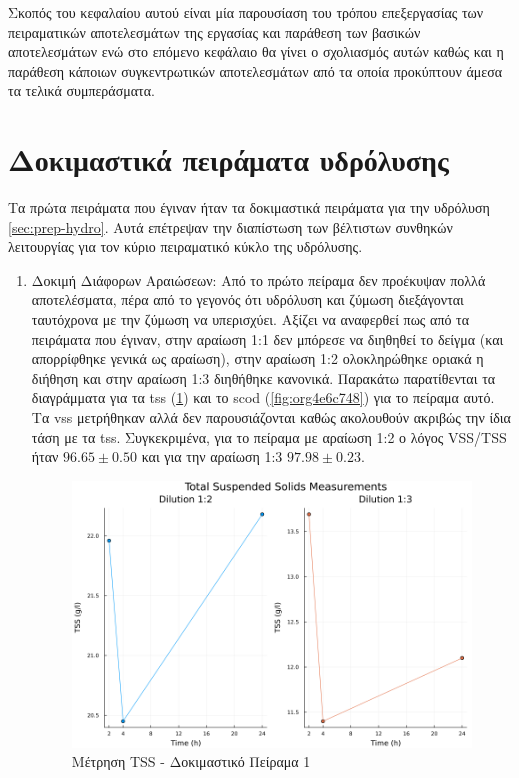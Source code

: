 \documentclass[11pt]{report}
\begin{document}
Σκοπός του κεφαλαίου αυτού είναι μία παρουσίαση του τρόπου επεξεργασίας των πειραματικών αποτελεσμάτων της εργασίας και παράθεση των βασικών αποτελεσμάτων ενώ στο επόμενο κεφάλαιο θα γίνει ο σχολιασμός αυτών καθώς και η παράθεση κάποιων συγκεντρωτικών αποτελεσμάτων από τα οποία προκύπτουν άμεσα τα τελικά συμπεράσματα.

\section{Δοκιμαστικά πειράματα υδρόλυσης}
\label{sec:org9308642}
Τα πρώτα πειράματα που έγιναν ήταν τα δοκιμαστικά πειράματα για την υδρόλυση \autoref{sec:prep-hydro}. Αυτά επέτρεψαν την διαπίστωση των βέλτιστων συνθηκών λειτουργίας για τον κύριο πειραματικό κύκλο της υδρόλυσης.

\begin{enumerate}
\item Δοκιμή Διάφορων Αραιώσεων:
\label{sec:org20d5127}
Από το πρώτο πείραμα δεν προέκυψαν πολλά αποτελέσματα, πέρα από το γεγονός ότι υδρόλυση και ζύμωση διεξάγονται ταυτόχρονα με την ζύμωση να υπερισχύει. Αξίζει να αναφερθεί πως από τα πειράματα που έγιναν, στην αραίωση 1:1 δεν μπόρεσε να διηθηθεί το δείγμα (και απορρίφθηκε γενικά ως αραίωση), στην αραίωση 1:2 ολοκληρώθηκε οριακά η διήθηση και στην αραίωση 1:3 διηθήθηκε κανονικά. Παρακάτω παρατίθενται τα διαγράμματα για τα \acrfull{tss} (\ref{fig:org56b12cb}) και το \acrfull{scod} (\ref{fig:org4e6c748}) για το πείραμα αυτό. Τα \acrfull{vss} μετρήθηκαν αλλά δεν παρουσιάζονται καθώς ακολουθούν ακριβώς την ίδια τάση με τα \acrfull{tss}. Συγκεκριμένα, για το πείραμα με αραίωση 1:2 ο λόγος VSS/TSS ήταν \(96.65 \pm 0.50\) και για την αραίωση 1:3 \(97.98 \pm 0.23\). 

\begin{figure}[htbp]
\centering
\includegraphics[width=.9\linewidth]{../plots/10_10/tss_plot.png}
\caption{\label{fig:org56b12cb}Μέτρηση TSS - Δοκιμαστικό Πείραμα 1}
\end{figure}


\end{enumerate}
\end{document}
